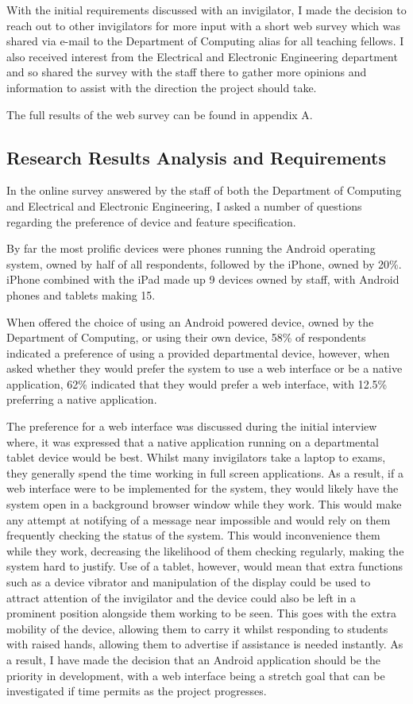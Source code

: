 \documentclass[a4paper, 12pt, notitlepage]{report}
\begin{document}
With the initial requirements discussed with an invigilator, I made the decision to reach out to other invigilators for more input with a short web survey which was shared via e-mail to the Department of Computing alias for all teaching fellows.  I also received interest from the Electrical and Electronic Engineering department and so shared the survey with the staff there to gather more opinions and information to assist with the direction the project should take.

The full results of the web survey can be found in appendix A.

\subsection{Research Results Analysis and Requirements}

In the online survey answered by the staff of both the Department of Computing and Electrical and Electronic Engineering, I asked a number of questions regarding the preference of device and feature specification.

By far the most prolific devices were phones running the Android operating system, owned by half of all respondents, followed by the iPhone, owned by 20\%.  iPhone combined with the iPad made up 9 devices owned by staff, with Android phones and tablets making 15.

When offered the choice of using an Android powered device, owned by the Department of Computing, or using their own device, 58\% of respondents indicated a preference of using a provided departmental device, however, when asked whether they would prefer the system to use a web interface or be a native application, 62\% indicated that they would prefer a web interface, with 12.5\% preferring a native application.

The preference for a web interface was discussed during the initial interview where, it was expressed that a native application running on a departmental tablet device would be best.  Whilst many invigilators take a laptop to exams, they generally spend the time working in full screen applications.  As a result, if a web interface were to be implemented for the system, they would likely have the system open in a background browser window while they work.  This would make any attempt at notifying of a message near impossible and would rely on them frequently checking the status of the system.  This would inconvenience them while they work, decreasing the likelihood of them checking regularly, making the system hard to justify.  Use of a tablet, however, would mean that extra functions such as a device vibrator and manipulation of the display could be used to attract attention of the invigilator and the device could also be left in a prominent position alongside them working to be seen.  This goes with the extra mobility of the device, allowing them to carry it whilst responding to students with raised hands, allowing them to advertise if assistance is needed instantly.  As a result, I have made the decision that an Android application should be the priority in development, with a web interface being a stretch goal that can be investigated if time permits as the project progresses.
\end{document}
